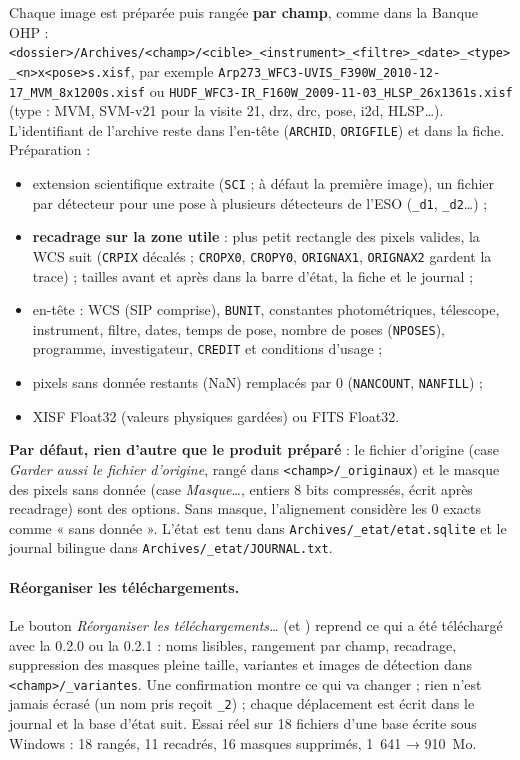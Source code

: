 Chaque image est préparée puis rangée \textbf{par champ}, comme dans la Banque OHP :
\texttt{<dossier>/Archives/<champ>/<cible>\_<instrument>\_<filtre>\_<date>\_<type>\_<n>x<pose>s.xisf}, par exemple
\texttt{Arp273\_WFC3-UVIS\_F390W\_2010-12-17\_MVM\_8x1200s.xisf} ou
\texttt{HUDF\_WFC3-IR\_F160W\_2009-11-03\_HLSP\_26x1361s.xisf} (type : MVM, SVM-v21 pour la visite 21, drz, drc,
pose, i2d, HLSP…). L'identifiant de l'archive reste dans l'en-tête (\texttt{ARCHID}, \texttt{ORIGFILE}) et dans la
fiche. Préparation :
\begin{itemize}
\item extension scientifique extraite (\texttt{SCI} ; à défaut la première image), un fichier par détecteur pour une
  pose à plusieurs détecteurs de l'ESO (\texttt{\_d1}, \texttt{\_d2}…) ;
\item \textbf{recadrage sur la zone utile} : plus petit rectangle des pixels valides, la WCS suit
  (\texttt{CRPIX} décalés ; \texttt{CROPX0}, \texttt{CROPY0}, \texttt{ORIGNAX1}, \texttt{ORIGNAX2} gardent la trace) ;
  tailles avant et après dans la barre d'état, la fiche et le journal ;
\item en-tête : WCS (SIP comprise), \texttt{BUNIT}, constantes photométriques, télescope, instrument, filtre, dates,
  temps de pose, nombre de poses (\texttt{NPOSES}), programme, investigateur, \texttt{CREDIT} et conditions d'usage ;
\item pixels sans donnée restants (NaN) remplacés par 0 (\texttt{NANCOUNT}, \texttt{NANFILL}) ;
\item XISF Float32 (valeurs physiques gardées) ou FITS Float32.
\end{itemize}
\textbf{Par défaut, rien d'autre que le produit préparé} : le fichier d'origine (case \emph{Garder aussi le fichier
d'origine}, rangé dans \texttt{<champ>/\_originaux}) et le masque des pixels sans donnée (case \emph{Masque…},
entiers 8 bits compressés, écrit après recadrage) sont des options. Sans masque, l'alignement considère les 0 exacts
comme « sans donnée ». L'état est tenu dans \texttt{Archives/\_etat/etat.sqlite} et le journal bilingue dans
\texttt{Archives/\_etat/JOURNAL.txt}.

\paragraph{Réorganiser les téléchargements.} Le bouton \emph{Réorganiser les téléchargements…} (et
) reprend ce qui a été téléchargé avec la 0.2.0 ou la 0.2.1 : noms lisibles,
rangement par champ, recadrage, suppression des masques pleine taille, variantes et images de détection dans
\texttt{<champ>/\_variantes}. Une confirmation montre ce qui va changer ; rien n'est jamais écrasé (un nom pris
reçoit \texttt{\_2}) ; chaque déplacement est écrit dans le journal et la base d'état suit. Essai réel sur 18 fichiers
d'une base écrite sous Windows : 18 rangés, 11 recadrés, 16 masques supprimés, 1~641 → 910~Mo.

